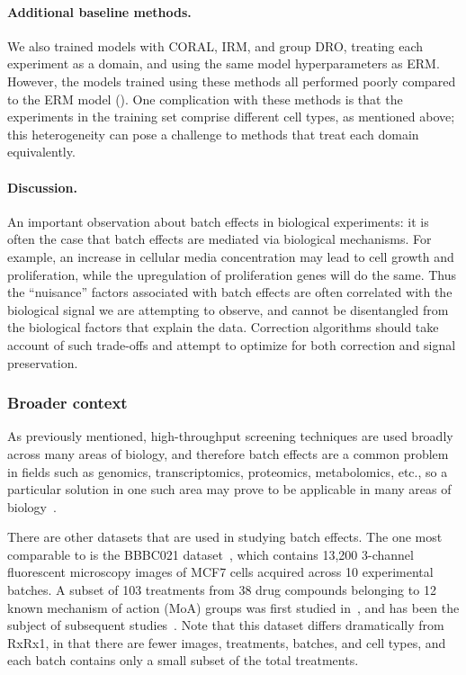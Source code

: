 \paragraph{Additional baseline methods.}
We also trained models with CORAL, IRM, and group DRO, treating each experiment
as a domain, and using the same model hyperparameters as ERM.
However, the models trained using these methods all performed poorly compared to the ERM model ().
One complication with these methods is that the experiments in the training set comprise different cell types, as mentioned above; this heterogeneity can pose a challenge to methods that treat each domain equivalently.

\paragraph{Discussion.}
An important observation about batch effects in biological experiments: it is
often the case that batch effects are mediated via biological mechanisms. For
example, an increase in cellular media concentration may lead to cell growth and
proliferation, while the upregulation of proliferation genes will do the same.
Thus the ``nuisance'' factors associated with batch effects are often correlated
with the biological signal we are attempting to observe, and cannot be
disentangled from the biological factors that explain the data. Correction algorithms
should take account of such trade-offs and attempt to optimize for both
correction and signal preservation.

\subsubsection{Broader context}
As previously mentioned, high-throughput screening techniques are used broadly
across many areas of biology, and therefore batch effects are a common problem
in fields such as genomics, transcriptomics, proteomics, metabolomics, etc., so
a particular solution in one such area may prove to be applicable in many areas
of biology~\citep{goh2017batch}.

There are other datasets that are used in studying batch effects. The one most
comparable to \RxRx is the BBBC021 dataset~\citep{ljosa2012annotated}, which
contains 13,200 3-channel fluorescent microscopy images of MCF7 cells acquired
across 10 experimental batches. A subset of 103 treatments from 38 drug
compounds belonging to 12 known mechanism of action (MoA) groups was first
studied in~\cite{ando2017improving}, and has been the subject of subsequent
studies~\citep{caicedo2018weakly,godinez2018unsupervised,tabak2020correcting}.
Note that this dataset differs dramatically from RxRx1, in that there are fewer
images, treatments, batches, and cell types, and each batch contains only a
small subset of the total treatments.

